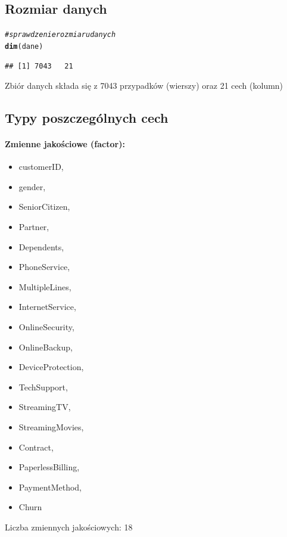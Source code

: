 \documentclass[12pt, a4paper]{article}\usepackage[]{graphicx}\usepackage[]{xcolor}
\makeatletter
\newcommand{\hlcom}[1]{\textcolor[rgb]{0.678,0.584,0.686}{\textit{#1}}}%
\newcommand{\hlstd}[1]{\textcolor[rgb]{0.345,0.345,0.345}{#1}}%
\newcommand{\hlkwd}[1]{\textcolor[rgb]{0.737,0.353,0.396}{\textbf{#1}}}%
\newenvironment{kframe}{%
 \def\at@end@of@kframe{}%
 \ifinner\ifhmode%
  \def\at@end@of@kframe{\end{minipage}}%
  \begin{minipage}{\columnwidth}%
 \fi\fi%
 \def\FrameCommand##1{\hskip\@totalleftmargin \hskip-\fboxsep
 \colorbox{shadecolor}{##1}\hskip-\fboxsep
     \hskip-\linewidth \hskip-\@totalleftmargin \hskip\columnwidth}%
 \MakeFramed {\advance\hsize-\width
   \@totalleftmargin\z@ \linewidth\hsize
   \@setminipage}}%
 {\par\unskip\endMakeFramed%
 \at@end@of@kframe}
\newenvironment{knitrout}{}{} %
\makeatother
\begin{document}
\subsection{Rozmiar danych}
\begin{knitrout}
\color{fgcolor}\begin{kframe}
\begin{alltt}
\hlcom{# sprawdzenie rozmiaru danych}
\hlkwd{dim}\hlstd{(dane)}
\end{alltt}
\begin{verbatim}
## [1] 7043   21
\end{verbatim}
\end{kframe}
\end{knitrout}


Zbiór danych składa się z 7043 przypadków (wierszy) oraz 21 cech (kolumn)

\subsection{Typy poszczególnych cech}



\paragraph{Zmienne jakościowe (factor):}
\begin{itemize}
\item customerID, \item gender, \item SeniorCitizen, \item Partner, \item Dependents, \item PhoneService, \item MultipleLines, \item InternetService, \item OnlineSecurity, \item OnlineBackup, \item DeviceProtection, \item TechSupport, \item StreamingTV, \item StreamingMovies, \item Contract, \item PaperlessBilling, \item PaymentMethod, \item Churn
\end{itemize}
Liczba zmiennych jakościowych: 18
\end{document}
